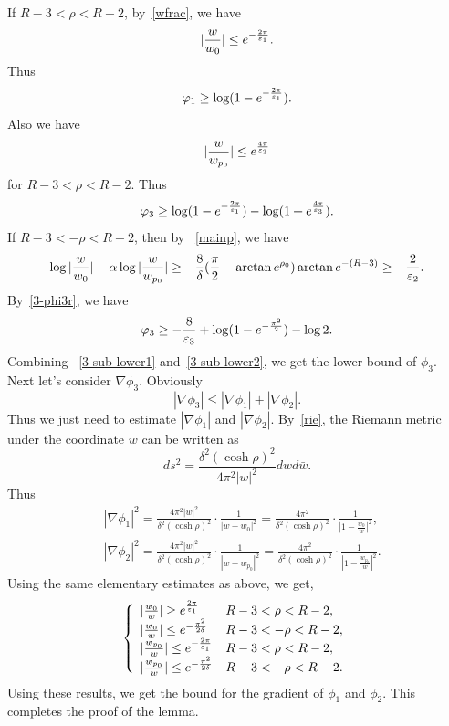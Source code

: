 If $R-3<\rho<R-2$, 
by~\eqref{wfrac},
we have
\begin{equation}
|\frac{w}{w_0}|\leq e^{-\frac{2\pi}{\varepsilon_1}}.
\end{equation}
Thus
\begin{equation}
\varphi_1\geq\log(1-e^{-\frac{2\pi}{\varepsilon_1}}).
\end{equation}
Also we have
\begin{equation}
|\frac{w}{w_{p_0}}|\leq e^{\frac{4\pi}{\varepsilon_3}}
\end{equation}
for $R-3<\rho<R-2$.
Thus
\begin{equation}\label{3-sub-lower1}
\varphi_3\geq\log(1-e^{-\frac{2\pi}{\varepsilon_1}})
-\log(1+e^{\frac{4\pi}{\varepsilon_3}}).
\end{equation}
If $R-3<-\rho<R-2$, then by ~\eqref{mainp}, we have
\[
\log|\frac{w}{w_0}|-\alpha\log|\frac{w}{w_{p_0}}|
\geq-\frac{8}{\delta}(\frac\pi 2-\arctan e^{\rho_0})\arctan e^{-(R-3)}
\geq -\frac{2}{\varepsilon_2}.
\]
By~\eqref{3-phi3r}, we have
\begin{equation}\label{3-sub-lower2}
\varphi_3\geq -\frac{8}{\varepsilon_3}+\log (1-e^{-\frac{\pi^2}{2}})
-\log 2.
\end{equation}
Combining ~\eqref{3-sub-lower1} and~\eqref{3-sub-lower2}, we get the 
lower bound of $\phi_3$.
Next let's  consider $\nabla\phi_3$. Obviously
\[
|\nabla\phi_3|\leq|\nabla\phi_1|+|\nabla\phi_2|.
\]
Thus we just need to estimate
$|\nabla\phi_1|$ and $|\nabla\phi_2|$. 
By~\eqref{rie}, the Riemann metric under the
coordinate $w$ can be written as 
\[
ds^2=\frac{\delta^2(\cosh\rho)^2}{4\pi^2|w|^2}dw d\bar w.
\]
Thus
\begin{align*}
&|\nabla\phi_1|^2=\frac{4\pi^2|w|^2}{\delta^2(\cosh\rho)^2}
\cdot\frac{1}{|w-w_0|^2}=\frac{4\pi^2}{\delta^2(\cosh\rho)^2}
\cdot\frac{1}{|1-\frac{w_0}{w}|^2},\\
&|\nabla\phi_2|^2=\frac{4\pi^2|w|^2}{\delta^2(\cosh\rho)^2}
\cdot\frac{1}{|w-w_{p_0}|^2}
=\frac{4\pi^2}{\delta^2(\cosh\rho)^2}     
\cdot\frac{1}{|1-\frac{w_{p_0}}{w}|^2}.
\end{align*}
Using the same elementary estimates as above, we get,
\begin{equation}
\left\{
\begin{array}{ll}
|\frac{w_0}{w}|\geq e^{\frac{2\pi}{\varepsilon_1}}&
R-3<\rho<R-2,\\
|\frac{w_0}{w}|\leq e^{-\frac{\pi^2}{2\delta}}&
R-3<-\rho<R-2,\\
|\frac{w_{p_0}}{w}|\leq e^{-\frac{2\pi}{\varepsilon_1}}&
R-3<\rho<R-2,\\
|\frac{w_{p_0}}{w}|\leq e^{-\frac{\pi^2}{2\delta}}
&
R-3<-\rho<R-2.
\end{array}
\right.
\end{equation}
Using these results, we get the bound for the gradient of $\phi_1$ and
$\phi_2$. 
This completes the proof of the lemma.

